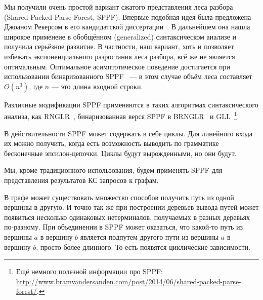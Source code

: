 \begin{example}
\begin{center}
{
}
\end{center}


\end{example}


Мы получили очень простой вариант сжатого представления леса разбора (Shared Packed Parse Forest, SPPF). 
Впервые подобная идея была предложена Джоаном Рекерсом в его кандидатской диссертации~\cite{SPPF}.
В дальнейшем она нашла широкое применеие в обобщённом (generalized) синтаксическом анализе и получила серьёзное развитие.
В частности, наш вариант, хоть и позволяет избежать экспоненциального разростания леса разбора, всё же не является оптимальным.
Оптимальное асимптотическое поведение достигается при использовании бинаризованного SPPF~\cite{Billot:1989:SSF:981623.981641} --- в этом случае объём леса составляет $O(n^3)$, где $n$ --- это длина входной строки.

Различные модификации SPPF применяются в таких алгоритмах синтаксического анализа, как RNGLR~\cite{Scott:2006:RNG:1146809.1146810}, бинаризованная верся SPPF в BRNGLR~\cite{Scott:2007:BCT:1289813.1289815} и GLL~\cite{Scott:2010:GP:1860132.1860320,10.1007/978-3-662-46663-6_5}\footnote{Ещё немного полезной информации про SPPF: \url{http://www.bramvandersanden.com/post/2014/06/shared-packed-parse-forest/}.}.

В действительности SPPF может содержать в себе циклы. Для линейного входа их можно получить, когда есть возможность выводить по грамматике бесконечные эпсилон-цепочки. Циклы будут вырожденными, но они будут. 

Мы, кроме традиционного использования, будем применять SPPF для представления результатов КС запросов к графам.

В графе может существовать множество способов получить путь из одной вершины в другую. И точно так же при построении деревьев вывода путей может появиться несколько одинаковых нетерминалов, получаемых в разных деревьях по-разному. При объединении в SPPF может оказаться, что какой-то путь из вершины $a$ в вершину $b$ является подпутем другого пути из вершины $a$ в вершину $b$, просто более длинного. То есть появятся циклические зависимости.

